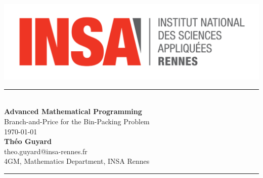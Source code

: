 \begin{titlepage}
	\includegraphics[scale=0.1]{img/logo-insa.png}
	\vspace{3cm}
	\begin{center}
		\noindent\rule{\textwidth}{0.5pt} \\
		\vspace{0.5cm}
		{\Huge \textbf{Advanced Mathematical Programming}}
		\vspace{0.1cm} \\
		{\Large Branch-and-Price for the Bin-Packing Problem}
		\vspace{0.5cm} \\
		\today
		\vspace{0.5cm} \\
		\textbf{Théo Guyard}
		\vspace{0.1cm} \\
		theo.guyard@insa-rennes.fr
		\vspace{0.1cm} \\
		4GM, Mathematics Department, INSA Rennes
		\vspace{0.3cm}
		\noindent\rule{\textwidth}{1pt}
	\end{center}
	\vspace{2cm}
	\begin{abstract}
		This technical report presents a Branch-and-Price algorithm aiming to solve the Bin-Packing problem. For this algorithm, two different branching rules and three different exploration methods are implemented. A dynamic programming method able to solve the subproblems dynamically instead of using a classical LP solver is also provided. Furthermore, 
		heuristics which can tighten upper and lower bounds can be proceeded before and during the branching tree exploration . In the first section, the mathematical background of a Branch and Price method suited for the Bin-Packing problem is presented. In the second section, the main structure of the  algorithm is exposed with some details about its simplest parts. The third section presents the node processing method for the Ryan \& Foster and the Generic branching scheme. Then, the heuristics implemented are detailed. Some other method not yet implemented but which could have improve the algorithm are presented in the fifth section. Finally, some details about the implementation and the computational results are given in the last section.
	\end{abstract}
	\vfill
\end{titlepage}